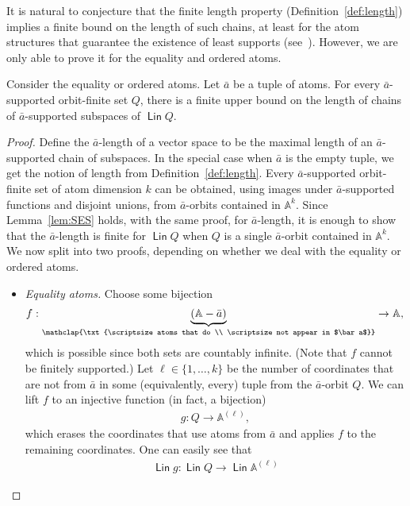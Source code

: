 \documentclass{theoretics}
\newcommand{\set}[1]{\{#1\}}
\newcommand{\myunderbrace}[2]{\underbrace{#1}_{\mathclap{\txt{\scriptsize #2}}}}
\newcommand{\atoms}{\mathbb A}
\DeclareMathOperator{\lin}{\mathsf{Lin}}
\begin{document}
It is natural to conjecture that the finite length property (Definition~\ref{def:length}) implies a finite bound on the length of such chains, at least for the atom structures that guarantee the existence of least supports (see~\cite[Section 9]{BKL14}). However, we are only able to prove it for the equality and ordered atoms.

\begin{theorem}\label{cor:finsup-length}
	Consider the equality or ordered atoms. Let $\bar a$ be a tuple of atoms.  For every $\bar a$-supported orbit-finite set $Q$, there is a finite upper bound on the length of chains of $\bar a$-supported subspaces of $\lin Q$.
\end{theorem}
\begin{proof}
	Define the $\bar a$-length of a vector space to be the maximal length of an $\bar a$-supported chain of subspaces. In the special case when $\bar a$ is the empty tuple, we get the notion of length from Definition~\ref{def:length}. 
	Every $\bar a$-supported orbit-finite set of atom dimension $k$ can be obtained, using images under $\bar a$-supported functions and disjoint unions, from $\bar a$-orbits contained in $\atoms^k$. Since 
	 Lemma~\ref{lem:SES} holds, with the same proof,  for $\bar a$-length, it is enough to show that the $\bar a$-length is finite for $\lin Q$ when $Q$ is a single $\bar a$-orbit contained in $\atoms^k$. We now split into two proofs, depending on whether we deal with the equality or ordered atoms. 
	 \begin{itemize}
	 \item \emph{Equality atoms.} Choose some bijection 
	 \begin{align*}
	 f : \myunderbrace{(\atoms - \bar a)}{atoms that do  \\
	 \scriptsize not appear in $\bar a$} \to \atoms,
	 \end{align*}
	 which is possible since both sets are countably infinite. (Note that $f$ cannot be finitely supported.) Let $\ell \in \set{1,\ldots,k}$ be the number of coordinates that are not from $\bar a$ in some (equivalently, every) tuple from the $\bar a$-orbit $Q$.  We can lift $f$ to an injective function (in fact, a bijection) 
	 \begin{align*}
	 g : Q \to \atoms^{(\ell
	 )},
	 \end{align*}
	 which erases the coordinates that use atoms from $\bar a$ and applies $f$ to the remaining coordinates. One can easily see that 
	 \begin{align*}
	 \lin g : \lin Q \to \lin \atoms^{(\ell)}

\end{align*}
\end{itemize}
\end{proof}
\end{document}
